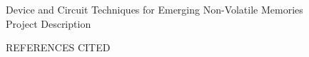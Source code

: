 \documentclass[11pt,letterpaper]{article}
\begin{document}
\vspace*{-0.5\baselineskip} \vspace*{-\baselineskip}

\thispagestyle{empty}

%
\setcounter{page}{1}

\begin{center}
{\Large Device and Circuit Techniques for Emerging Non-Volatile Memories}\\
\vspace*{0.75\baselineskip}
{\Large Project Description}\\

\end{center}




%



\pagebreak

\setcounter{page}{1} \pagebreak
\begin{center}
{\Large  REFERENCES CITED} \\
\end{center}
\setlength{\itemsep}{0pt} \setlength{\parskip}{0pt}


%



             

%
\end{document}
